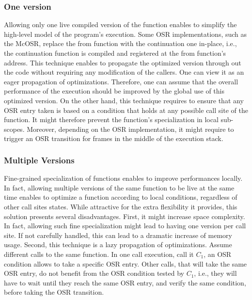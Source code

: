 \subsubsection{One version}
Allowing only one live compiled version of the function enables to simplify the high-level model of the program's execution.
Some OSR implementations, such as the McOSR\cite{lameed2013modular}, replace the from function with the continuation one in-place, i.e., the continuation function is compiled and registered at the from function's address.
This technique enables to propagate the optimized version through out the code without requiring any modification of the callers.
One can view it as an eager propagation of optimizations.
Therefore, one can assume that the overall performance of the execution should be improved by the global use of this optimized version.
On the other hand, this technique requires to ensure that any OSR entry taken is based on a condition that holds at any possible call site of the function.
It might therefore prevent the function's specialization in local sub-scopes.
Moreover, depending on the OSR implementation, it might require to trigger an OSR transition for frames in the middle of the execution stack.
\\


\subsubsection{Multiple Versions}
Fine-grained specialization of functions enables to improve performances locally.
In fact, allowing multiple versions of the same function to be live at the same time enables to optimize a function according to local conditions, regardless of other call sites states.
While attractive for the extra flexibility it provides, this solution presents several disadvantages.
First, it might increase space complexity.
In fact, allowing such fine specialization might lead to having one version per call site.
If not carefully handled, this can lead to a dramatic increase of memory usage.
Second, this technique is a lazy propagation of optimizations.
Assume different calls to the same function.
In one call execution, call it $C_1$, an OSR condition allows to take a specific OSR entry.
Other calls, that will take the same OSR entry, do not benefit from the OSR condition tested by $C_1$, i.e., they will have to wait until they reach the same OSR entry, and verify the same condition, before taking the OSR transition.



